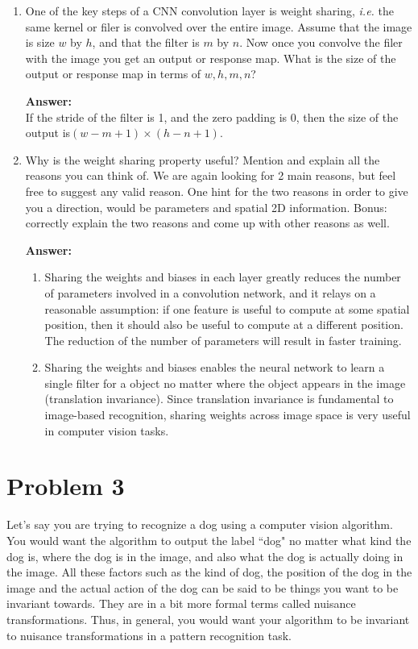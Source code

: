 \documentclass[letterpaper,11pt]{article}
\begin{document}
\begin{enumerate}
	\item One of the key steps of a CNN convolution layer is weight sharing, \textit{i.e.} the same kernel or filer is convolved over the entire image. Assume that the image is size $w$ by $h$, and that the filter is $m$ by $n$. Now once you convolve the filer with the image you get an output or response map. What is the size of the output or response map in terms of $w,h,m,n$?
	
	\textbf{Answer:}\\
	If the stride of the filter is 1, and the zero padding is 0, then the size of the output is$(w-m+1)\times(h-n+1)$.
	
	\item Why is the weight sharing property useful? Mention and explain all the reasons you can think of. We are again looking for 2 main reasons, but feel free to suggest any valid reason. One hint for the two reasons in order to give you a direction, would be parameters and spatial 2D information. Bonus: correctly explain the two reasons and come up with other reasons as well.
	
	\textbf{Answer:}\\
	\begin{enumerate}
		\item Sharing the weights and biases in each layer greatly reduces the number of parameters involved in a convolution network, and it relays on a reasonable assumption: if one feature is useful to compute at some spatial position, then it should also be useful to compute at a different position. The reduction of the number of parameters will result in faster training.
		\item Sharing the weights and biases enables the neural network to learn a single filter for a object no matter where the object appears in the image (translation invariance). Since translation invariance is fundamental to image-based recognition, sharing weights across image space is very useful in computer vision tasks.
	\end{enumerate}
	
\end{enumerate}

\section*{Problem 3}

Let's say you are trying to recognize a dog using a computer vision algorithm. You would want the algorithm to output the label ``dog" no matter what kind the dog is, where the dog is in the image, and also what the dog is actually doing in the image. All these factors such as the kind of dog, the position of the dog in the image and the actual action of the dog can be said to be things you want to be invariant towards. They are in a bit more formal terms called nuisance transformations. Thus, in general, you would want your algorithm to be invariant to nuisance transformations in a pattern recognition task.
\end{document}

